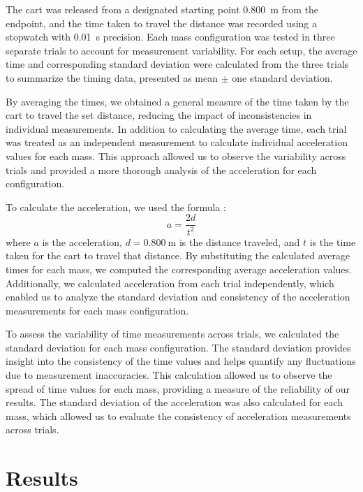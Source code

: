 ﻿\documentclass[reprint,amsmath,amssymb.aps]{revtex4-2}
\begin{document}
The cart was released from a designated starting point \qty{0.800}{\meter} from the endpoint, and the time taken to travel the distance was recorded using a stopwatch with \qty{0.01}{\second} precision. Each mass configuration was tested in three separate trials to account for measurement variability. For each setup, the average time and corresponding standard deviation were calculated from the three trials to summarize the timing data, presented as mean $\pm$ one standard deviation.

By averaging the times, we obtained a general measure of the time taken by the cart to travel the set distance, reducing the impact of inconsistencies in individual measurements. In addition to calculating the average time, each trial was treated as an independent measurement to calculate individual acceleration values for each mass. This approach allowed us to observe the variability across trials and provided a more thorough analysis of the acceleration for each configuration.

To calculate the acceleration, we used the formula \cite{knight2017physics}:  
\begin{equation}
a = \dfrac{2d}{t^2}
\end{equation}
where $a$ is the acceleration, $d=\qty{0.800}{\meter}$ is the distance traveled, and $t$ is the time taken for the cart to travel that distance. By substituting the calculated average times for each mass, we computed the corresponding average acceleration values. Additionally, we calculated acceleration from each trial independently, which enabled us to analyze the standard deviation and consistency of the acceleration measurements for each mass configuration.

To assess the variability of time measurements across trials, we calculated the standard deviation for each mass configuration. The standard deviation provides insight into the consistency of the time values and helps quantify any fluctuations due to measurement inaccuracies. This calculation allowed us to observe the spread of time values for each mass, providing a measure of the reliability of our results. The standard deviation of the acceleration was also calculated for each mass, which allowed us to evaluate the consistency of acceleration measurements across trials.






\section{Results}
\end{document}
